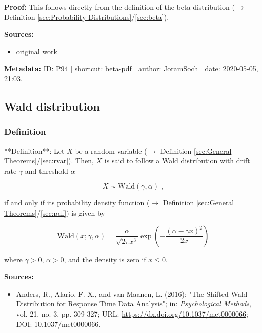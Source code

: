 \documentclass[a4paper,12pt,twoside]{book}
\begin{document}
\vspace{1em}
\textbf{Proof:} This follows directly from the definition of the beta distribution ($\rightarrow$ Definition \ref{sec:Probability Distributions}/\ref{sec:beta}).


\vspace{1em}
\textbf{Sources:}
\begin{itemize}
\item original work\end{itemize}


\vspace{1em}
\textbf{Metadata:} ID: P94 | shortcut: beta-pdf | author: JoramSoch | date: 2020-05-05, 21:03.
\vspace{1em}



\subsection{Wald distribution}

\subsubsection[\textit{Definition}]{Definition} \label{sec:wald}
\setcounter{equation}{0}

**Definition**: Let $X$ be a random variable ($\rightarrow$ Definition \ref{sec:General Theorems}/\ref{sec:rvar}). Then, $X$ is said to follow a Wald distribution with drift rate $\gamma$ and threshold $\alpha$

\begin{equation} \label{eq:wald-wald}
X \sim \mathrm{Wald}(\gamma, \alpha) \; ,
\end{equation}

if and only if its probability density function ($\rightarrow$ Definition \ref{sec:General Theorems}/\ref{sec:pdf}) is given by

\begin{equation} \label{eq:wald-wald-pdf}
\mathrm{Wald}(x; \gamma, \alpha) = \frac{\alpha}{\sqrt{2\pi x^3}}\exp\left(-\frac{(\alpha-\gamma x)^2}{2x}\right)
\end{equation}

where $\gamma > 0$, $\alpha > 0$, and the density is zero if $x \leq 0$.


\vspace{1em}
\textbf{Sources:}
\begin{itemize}
\item Anders, R., Alario, F.-X., and van Maanen, L. (2016): "The Shifted Wald Distribution for Response Time Data Analysis"; in: \textit{Psychological Methods}, vol. 21, no. 3, pp. 309-327; URL: \url{https://dx.doi.org/10.1037/met0000066}; DOI: 10.1037/met0000066.
\end{itemize}
\end{document}
